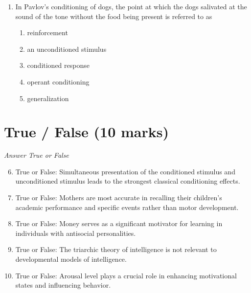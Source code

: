 \documentclass[12pt]{article}
\begin{document}
\begin{enumerate}[label=\arabic*.]
\begin{enumerate}[label=(\alph*)]
    \item The school must invest in more modern educational technology.
    \item Students who are not meeting competencies must be placed in lower grade levels.
    \item Students must be given more time to develop competencies.
    \item The school must hire more teachers to reduce class size.
    \item Parents of students not meeting competencies must be contacted for meetings.
\end{enumerate}
\item In Pavlov's conditioning of dogs, the point at which the dogs salivated at the sound of the tone without the food being present is referred to as
\begin{enumerate}[label=(\alph*)]
    \item reinforcement
    \item an unconditioned stimulus
    \item conditioned response
    \item operant conditioning
    \item generalization
\end{enumerate}
\end{enumerate}

\section*{True / False (10 marks)}
\textit{Answer True or False}
\begin{enumerate}[label=\arabic*.]
\setcounter{enumi}{5}
\item True or False: Simultaneous presentation of the conditioned stimulus and unconditioned stimulus leads to the strongest classical conditioning effects.
\item True or False: Mothers are most accurate in recalling their children's academic performance and specific events rather than motor development.
\item True or False: Money serves as a significant motivator for learning in individuals with antisocial personalities.
\item True or False: The triarchic theory of intelligence is not relevant to developmental models of intelligence.
\item True or False: Arousal level plays a crucial role in enhancing motivational states and influencing behavior.
\end{enumerate}
\end{document}
